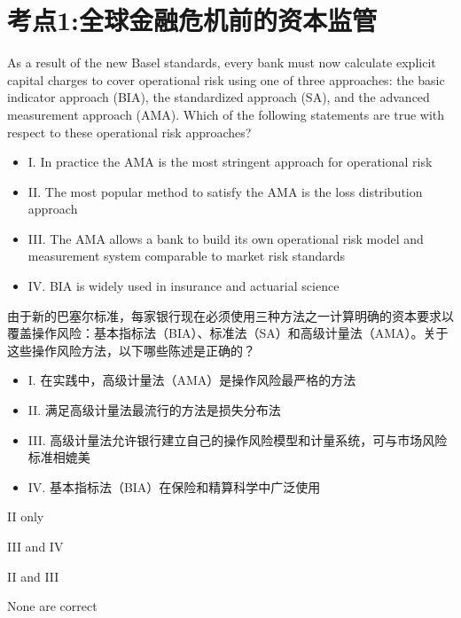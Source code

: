\documentclass{article}
\newcounter{question} %
\begin{document}
 \tableofcontents %
\newpage




\section{考点1:全球金融危机前的资本监管}
\setcounter{question}{0}


\begin{question}
    As a result of the new Basel standards, every bank must now calculate explicit capital charges to cover operational risk using one of three approaches: the basic indicator approach (BIA), the standardized approach (SA), and the advanced measurement approach (AMA). Which of the following statements are true with respect to these operational risk approaches?
    \begin{itemize}
    \item I. In practice the AMA is the most stringent approach for operational risk
    \item II. The most popular method to satisfy the AMA is the loss distribution approach
    \item III. The AMA allows a bank to build its own operational risk model and measurement system comparable to market risk standards
    \item IV. BIA is widely used in insurance and actuarial science
    \end{itemize}
    由于新的巴塞尔标准，每家银行现在必须使用三种方法之一计算明确的资本要求以覆盖操作风险：基本指标法（BIA）、标准法（SA）和高级计量法（AMA）。关于这些操作风险方法，以下哪些陈述是正确的？
    \begin{itemize}
    \item I. 在实践中，高级计量法（AMA）是操作风险最严格的方法
    \item II. 满足高级计量法最流行的方法是损失分布法
    \item III. 高级计量法允许银行建立自己的操作风险模型和计量系统，可与市场风险标准相媲美
    \item IV. 基本指标法（BIA）在保险和精算科学中广泛使用
    \end{itemize}
\end{question}

\begin{choices}
    \item II only
    \item III and IV
    \item II and III
    \item None are correct
\end{choices}
\end{document}
